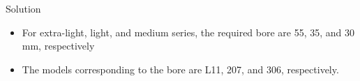 \documentclass[10pt, svgnames]{beamer}
\begin{document}
\begin{frame}[label={sec:org1fd64b9}]{Solution}
\begin{itemize}
\item For extra-light, light, and medium series, the required bore are 55, 35, and 30 mm, respectively

\item The models corresponding to the bore are L11, 207, and 306, respectively.
\end{itemize}
\end{frame}
\end{document}
